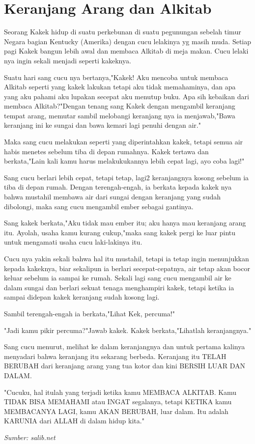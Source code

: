 \newpage
\small
\section*{\center Keranjang Arang dan Alkitab}
Seorang Kakek hidup di suatu perkebunan di suatu pegunungan sebelah timur Negara bagian Kentucky (Amerika) dengan cucu lelakinya yg masih muda. Setiap pagi Kakek bangun lebih awal dan membaca Alkitab di meja makan. Cucu lelaki nya ingin sekali menjadi seperti kakeknya.	

Suatu hari sang cucu nya bertanya,"Kakek! Aku mencoba untuk membaca Alkitab seperti yang kakek lakukan tetapi aku tidak memahaminya, dan apa yang aku pahami aku lupakan secepat aku menutup buku. Apa sih kebaikan dari membaca Alkitab?"Dengan tenang sang Kakek dengan mengambil keranjang tempat arang, memutar sambil melobangi keranjang nya ia menjawab,"Bawa keranjang ini ke sungai dan bawa kemari lagi penuhi dengan air."

Maka sang cucu melakukan seperti yang diperintahkan kakek, tetapi semua air habis menetes sebelum tiba di depan rumahnya. Kakek tertawa dan berkata,"Lain kali kamu harus melakukukannya lebih cepat lagi, ayo coba lagi!"

Sang cucu berlari lebih cepat, tetapi tetap, lagi2 keranjangnya kosong sebelum ia tiba di depan rumah. Dengan terengah-engah, ia berkata kepada kakek nya bahwa mustahil membawa air dari sungai dengan keranjang yang sudah dibolongi, maka sang cucu mengambil ember sebagai gantinya.

Sang kakek berkata,"Aku tidak mau ember itu; aku hanya mau keranjang arang itu. Ayolah, usaha kamu kurang cukup,"maka sang kakek pergi ke luar pintu untuk mengamati usaha cucu laki-lakinya itu.

Cucu nya yakin sekali bahwa hal itu mustahil, tetapi ia tetap ingin menunjukkan kepada kakeknya, biar sekalipun ia berlari secepat-cepatnya, air tetap akan bocor keluar sebelum ia sampai ke rumah. Sekali lagi sang cucu mengambil air ke dalam sungai dan berlari sekuat tenaga menghampiri kakek, tetapi ketika ia sampai didepan kakek keranjang sudah kosong lagi.

Sambil terengah-engah ia berkata,"Lihat Kek, percuma!"

"Jadi kamu pikir percuma?"Jawab kakek. Kakek berkata,"Lihatlah keranjangnya."

Sang cucu menurut, melihat ke dalam keranjangnya dan untuk pertama kalinya menyadari bahwa keranjang itu sekarang berbeda. Keranjang itu TELAH BERUBAH dari keranjang arang yang tua kotor dan kini BERSIH LUAR DAN DALAM.

"Cucuku, hal itulah yang terjadi ketika kamu MEMBACA ALKITAB. Kamu TIDAK BISA MEMAHAMI atau INGAT segalanya, tetapi KETIKA kamu MEMBACANYA LAGI, kamu AKAN BERUBAH, luar dalam. Itu adalah KARUNIA dari ALLAH di dalam hidup kita."

{\noindent \emph{Sumber: salib.net}}
\normalsize